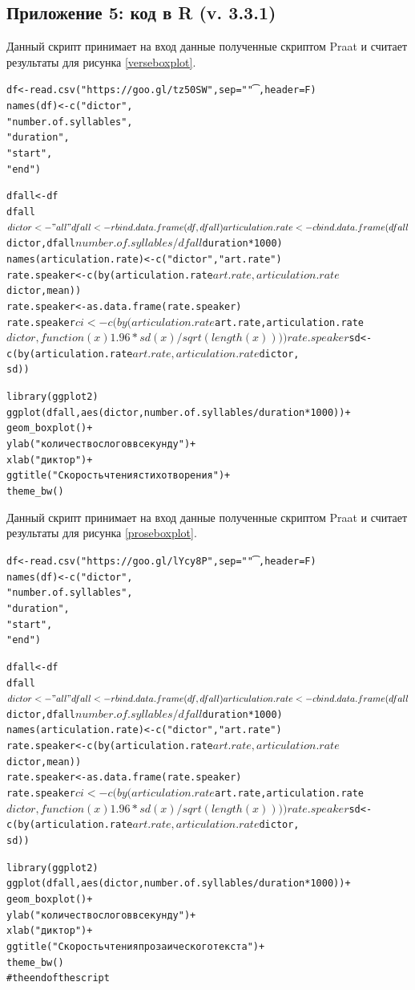 \subsection{Приложение 5: код в R (v. 3.3.1)} \label{Rscript}
\noindent Данный скрипт принимает на вход данные полученные скриптом Praat и считает результаты для рисунка \ref{verseboxplot}.
\scriptsize
\begin{alltt}
df <- read.csv("https://goo.gl/tz50SW", sep = "\t", header = F)
names(df) <- c("dictor",
               "number.of.syllables",
               "duration",
               "start",
               "end")

dfall <- df
dfall$dictor <- "all"
dfall <- rbind.data.frame(df, dfall)

articulation.rate <- cbind.data.frame(dfall$dictor, dfall$number.of.syllables/dfall$duration*1000)
names(articulation.rate) <- c("dictor", "art.rate")
rate.speaker <- c(by(articulation.rate$art.rate, articulation.rate$dictor, mean))
rate.speaker <- as.data.frame(rate.speaker)
rate.speaker$ci <- c(by(articulation.rate$art.rate, articulation.rate$dictor, 
                        function(x){1.96*sd(x)/sqrt(length(x))}))
rate.speaker$sd <- c(by(articulation.rate$art.rate, articulation.rate$dictor, 
                        sd))

library(ggplot2)
ggplot(dfall, aes(dictor, number.of.syllables/duration*1000))+
  geom_boxplot()+
  ylab("количество слогов в секунду")+
  xlab("диктор")+
  ggtitle("Скорость чтения стихотворения")+
  theme_bw()
\end{alltt}
\normalsize
\noindent Данный скрипт принимает на вход данные полученные скриптом Praat и считает результаты для рисунка \ref{proseboxplot}.
\scriptsize
\begin{alltt}
df <- read.csv("https://goo.gl/lYcy8P", sep = "\t", header = F)
names(df) <- c("dictor",
               "number.of.syllables",
               "duration",
               "start",
               "end")

dfall <- df
dfall$dictor <- "all"
dfall <- rbind.data.frame(df, dfall)

articulation.rate <- cbind.data.frame(dfall$dictor, dfall$number.of.syllables/dfall$duration*1000)
names(articulation.rate) <- c("dictor", "art.rate")
rate.speaker <- c(by(articulation.rate$art.rate, articulation.rate$dictor, mean))
rate.speaker <- as.data.frame(rate.speaker)
rate.speaker$ci <- c(by(articulation.rate$art.rate, articulation.rate$dictor, 
                        function(x){1.96*sd(x)/sqrt(length(x))}))
rate.speaker$sd <- c(by(articulation.rate$art.rate, articulation.rate$dictor, 
                        sd))


library(ggplot2)
ggplot(dfall, aes(dictor, number.of.syllables/duration*1000))+
  geom_boxplot()+
  ylab("количество слогов в секунду")+
  xlab("диктор")+
  ggtitle("Скорость чтения прозаического текста")+
  theme_bw()
# the end of the script
\end{alltt}
\normalsize
\pagebreak
